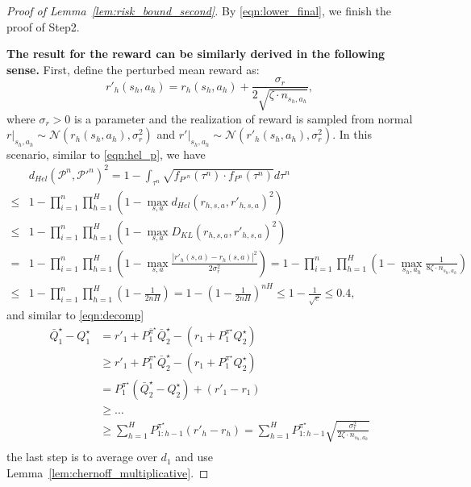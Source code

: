 \begin{proof}[Proof of Lemma~\ref{lem:risk_bound_second}]
By \eqref{eqn:lower_final}, we finish the proof of Step2.



\textbf{The result for the reward can be similarly derived in the following sense.} First, define the perturbed mean reward as: 
\begin{equation}
r'_h(s_h,a_h)=r_h(s_h,a_h)+\frac{\sigma_r}{2\sqrt{ \zeta\cdot n_{s_h,a_h}}},
\end{equation}
where $\sigma_r>0$ is a parameter and the realization of reward is sampled from normal $r|_{s_h,a_h}\sim\mathcal{N}(r_h(s_h,a_h), \sigma_r^2)$ and $r'|_{s_h,a_h}\sim\mathcal{N}(r'_h(s_h,a_h), \sigma_r^2)$. In this scenario, similar to \eqref{eqn:hel_p}, we have 
\begin{equation}
\begin{aligned}
&d_{Hel}(\mathcal{P}^n,\mathcal{P}'^n)^2=1-\int_{\tau^n}\sqrt{f_{P'^n}(\tau^n)\cdot f_{P^n}(\tau^n)}d\tau^n\\
\leq &1-\prod_{i=1}^n \prod_{h=1}^H(1-\max_{s,a} d_{Hel}(r_{h,s,a},{r}'_{h,s,a})^2)\\
\leq &1-\prod_{i=1}^n \prod_{h=1}^H(1-\max_{s,a} D_{KL}(r_{h,s,a},{r}'_{h,s,a})^2)\\
= & 1-\prod_{i=1}^n \prod_{h=1}^H(1-\max_{s,a} \frac{|r'_h(s,a)-r_h(s,a)|^2}{2\sigma^2_r})=1-\prod_{i=1}^n \prod_{h=1}^H(1-\max_{s_h,a_h} \frac{1}{8\zeta\cdot n_{s_h,a_h}})\\
\leq &1-\prod_{i=1}^n\prod_{h=1}^H\left(1-\frac{1}{2nH}\right)=1-\left(1-\frac{1}{2nH}\right)^{nH}\leq 1-\frac{1}{\sqrt{e}}\leq 0.4,
\end{aligned}
\end{equation}
and similar to  \eqref{eqn:decomp}
\begin{equation}
\begin{aligned}
\bar{Q}_1^\star-Q^\star_1&=r'_1+P^{\bar{\pi}^\star}_1\bar{Q}_2^\star-\left(r_1+P^{{\pi}^\star}_1{Q}_2^\star\right)\\
&\geq r'_1+P^{{\pi}^\star}_1\bar{Q}_2^\star-\left(r_1+P^{{\pi}^\star}_1{Q}_2^\star\right)\\
&=P^{{\pi}^\star}_1\left(\bar{Q}_2^\star-{Q}_2^\star\right)+\left(r'_1-r_1\right)\\
&\geq\ldots\\
&\geq\sum_{h=1}^H P^{{\pi}^\star}_{1:h-1}\left(r'_h-r_h\right)=\sum_{h=1}^H P^{{\pi}^\star}_{1:h-1}\sqrt{\frac{\sigma^2_r}{2\zeta\cdot n_{s_h,a_h}}}\\
\end{aligned}
\end{equation}
the last step is to average over $d_1$ and use Lemma~\ref{lem:chernoff_multiplicative}.
\end{proof}



